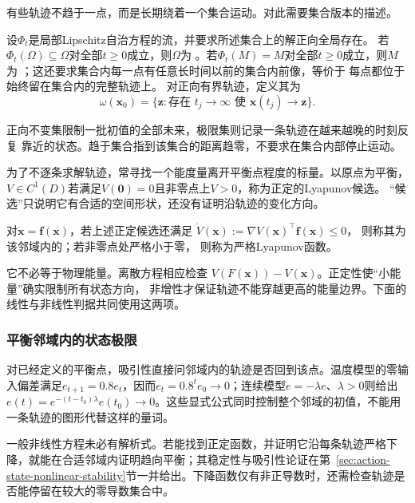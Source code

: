 有些轨迹不趋于一点，而是长期绕着一个集合运动。对此需要集合版本的描述。
\begin{definition}[不变集合与轨迹极限集]
  \label{def:dynamical-invariant-limit-sets}
  设$\Phi_t$是局部Lipschitz自治方程的流，并要求所述集合上的解正向全局存在。
  若$\Phi_t(\Omega)\subseteq\Omega$对全部$t\geq0$成立，则$\Omega$为
  。若$\Phi_t(M)=M$对全部$t\geq0$成立，则$M$为
  ；这还要求集合内每一点有任意长时间以前的集合内前像，等价于
  每点都位于始终留在集合内的完整轨迹上。
  对正向有界轨迹，定义其为
  \[
    \omega(\bm x_0)=
    \{\bm z:\text{存在 }t_j\to\infty\text{ 使 }\bm x(t_j)\to\bm z\}.
  \]
\end{definition}
正向不变集限制一批初值的全部未来，极限集则记录一条轨迹在越来越晚的时刻反复
靠近的状态。趋于集合指到该集合的距离趋零，不要求在集合内部停止运动。

为了不逐条求解轨迹，常寻找一个能度量离开平衡点程度的标量。以原点为平衡，
$V\in C^1(D)$若满足$V(\bm0)=0$且非零点上$V>0$，称为正定的Lyapunov候选。
“候选”只说明它有合适的空间形状，还没有证明沿轨迹的变化方向。
\begin{definition}[Lyapunov函数]
  \label{def:dynamical-lyapunov-function}
  对$\dot{\bm x}=\bm f(\bm x)$，若上述正定候选还满足
  $\dot V(\bm x):=\nabla V(\bm x)^\top\bm f(\bm x)\leq0$，
  则称其为该邻域内的；若非零点处严格小于零，
  则称为严格Lyapunov函数。
\end{definition}
它不必等于物理能量。离散方程相应检查
$V(F(\bm x))-V(\bm x)$。正定性使“小能量”确实限制所有状态方向，
非增性才保证轨迹不能穿越更高的能量边界。下面的线性与非线性判据共同使用这两项。

\subsubsection{平衡邻域内的状态极限}
对已经定义的平衡点，吸引性直接问邻域内的轨迹是否回到该点。温度模型的零输入偏差满足\(e_{t+1}=0.8e_t\)，因而\(e_t=0.8^t e_0\to0\)；连续模型\(\dot e=-\lambda e\)、\(\lambda>0\)则给出\(e(t)=e^{-(t-t_0)\lambda}e(t_0)\to0\)。这些显式公式同时控制整个邻域的初值，不能用一条轨迹的图形代替这样的量词。

一般非线性方程未必有解析式。若能找到正定函数，并证明它沿每条轨迹严格下降，就能在合适邻域内证明趋向平衡；其稳定性与吸引性论证在第~\ref{sec:action-state-nonlinear-stability}节一并给出。下降函数仅有非正导数时，还需检查轨迹是否能停留在较大的零导数集合中。


